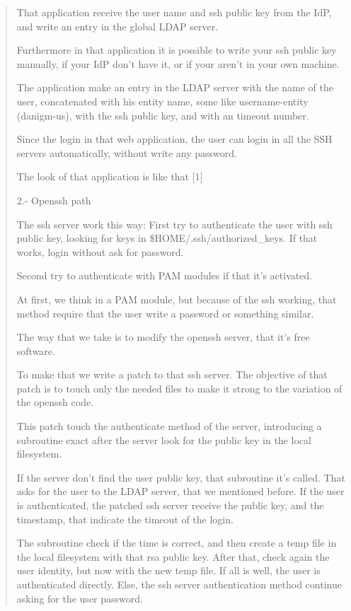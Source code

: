 \begin{quote}
    That application receive the user name and ssh public
    key from the IdP, and write an entry in the global LDAP server.

    Furthermore in that application it is possible to write your
    ssh public key manually, if your IdP don't have it, or if your
    aren't in your own machine.

    The application make an entry in the LDAP server with the name of
    the user, concatenated with his entity name, some like
    username-entity (danigm-us), with the ssh public key, and with an
    timeout number.

    Since the login in that web application, the user can login in all
    the SSH servers automatically, without write any password.

    The look of that application is like that [1]

    2.- Openssh path
    
    The ssh server work this way:
        First try to authenticate the user with ssh public key,
        looking for keys in \$HOME/.ssh/authorized\_keys. If that works,
        login without ask for password.

        Second try to authenticate with PAM modules if that it's
        activated.

    At first, we think in a PAM module, but because of the ssh
    working, that method require that the user write a password or
    something similar.

    The way that we take is to modify the openssh server, that it's
    free software.

    To make that we write a patch to that ssh server. The objective of
    that patch is to touch only the needed files to make it strong to
    the variation of the openssh code.

    This patch touch the authenticate method of the server,
    introducing a subroutine exact after the server look for the
    public key in the local filesystem. 

    If the server don't find the user public key, that subroutine it's
    called. That asks for the user to the LDAP server, that we mentioned
    before. If the user is authenticated, the patched ssh server
    receive the public key, and the timestamp, that indicate the
    timeout of the login.

    The subroutine check if the time is correct, and then create a
    temp file in the local filesystem with that rsa public key. After
    that, check again the user identity, but now with the new temp
    file. If all is well, the user is authenticated directly. Else,
    the ssh server authentication method continue asking for the user
    password.


\end{quote}

